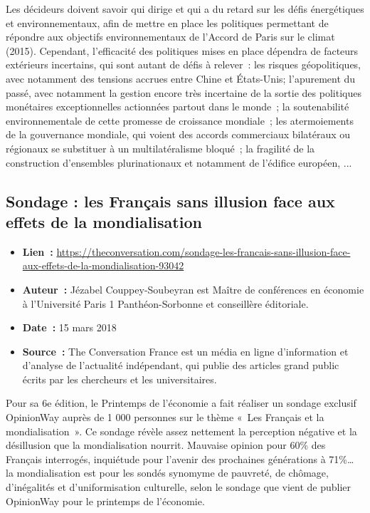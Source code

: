 \documentclass[8pt]{article}
\begin{document}
Les décideurs doivent savoir qui dirige et qui a du retard sur les défis énergétiques et environnementaux, afin de mettre en place les politiques permettant de répondre aux objectifs environnementaux de l'Accord de Paris sur le climat (2015).
Cependant, l'efficacité des politiques mises en place dépendra de facteurs extérieurs incertains, qui sont autant de défis à relever\ : 
les risques géopolitiques, avec notamment des tensions accrues entre Chine et États-Unis; 
l’apurement du passé, avec notamment la gestion encore très incertaine de la sortie des politiques monétaires exceptionnelles actionnées partout dans le monde\ ; 
la soutenabilité environnementale de cette promesse de croissance mondiale\ ; 
les atermoiements de la gouvernance mondiale, qui voient des accords commerciaux bilatéraux ou régionaux se substituer à un multilatéralisme bloqué\ ; 
la fragilité de la construction d’ensembles plurinationaux et notamment de l’édifice européen, ...

\newpage
\subsection{Sondage : les Français sans illusion face aux effets de la mondialisation}
\begin{itemize}
	\setlength\itemsep{-0.1em}
	\item \textbf{Lien~: }  \url{https://theconversation.com/sondage-les-francais-sans-illusion-face-aux-effets-de-la-mondialisation-93042} 
	\item \textbf{Auteur~: } Jézabel Couppey-Soubeyran est Maître de conférences en économie à l’Université Paris 1 Panthéon-Sorbonne et conseillère éditoriale.
	\item \textbf{Date~: } 15 mars 2018
	\item \textbf{Source~: }  The Conversation France est un média en ligne d'information et d'analyse de l'actualité indépendant, qui publie des articles grand public écrits par les chercheurs et les universitaires. 
\end{itemize}

Pour sa 6e édition, le Printemps de l’économie a fait réaliser un sondage exclusif OpinionWay auprès de 1 000 personnes sur le thème «\ Les Français et la mondialisation\ ».
Ce sondage révèle assez nettement la perception négative et la désillusion que la mondialisation nourrit. Mauvaise opinion pour 60\% des Français interrogés, inquiétude pour l’avenir des prochaines générations à 71\%… la mondialisation est pour les sondés synomyme de pauvreté, de chômage, d’inégalités et d’uniformisation culturelle, selon le sondage que vient de publier OpinionWay pour le printemps de l’économie.\\ 
\end{document}
